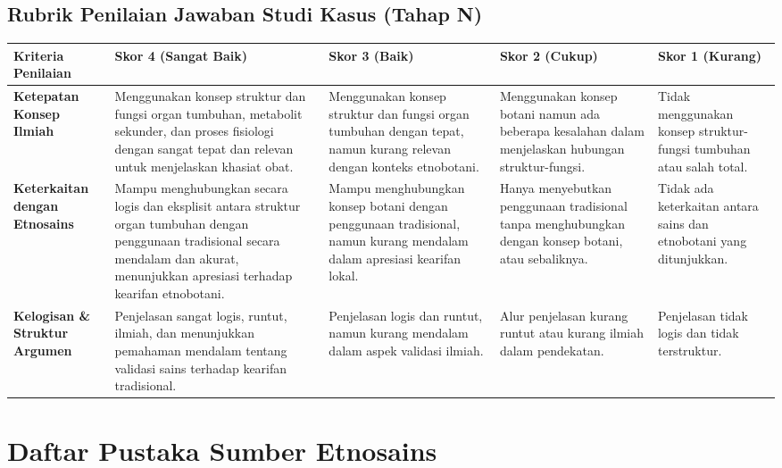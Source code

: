 \documentclass[a4paper,12pt]{article}
\begin{document}
\subsection{Rubrik Penilaian Jawaban Studi Kasus (Tahap N)}

\begin{longtable}{|p{3cm}|p{3cm}|p{3cm}|p{3cm}|p{3cm}|}
\hline
\textbf{Kriteria Penilaian} & \textbf{Skor 4 (Sangat Baik)} & \textbf{Skor 3 (Baik)} & \textbf{Skor 2 (Cukup)} & \textbf{Skor 1 (Kurang)} \\
\hline
\textbf{Ketepatan Konsep Ilmiah} & Menggunakan konsep struktur dan fungsi organ tumbuhan, metabolit sekunder, dan proses fisiologi dengan sangat tepat dan relevan untuk menjelaskan khasiat obat. & Menggunakan konsep struktur dan fungsi organ tumbuhan dengan tepat, namun kurang relevan dengan konteks etnobotani. & Menggunakan konsep botani namun ada beberapa kesalahan dalam menjelaskan hubungan struktur-fungsi. & Tidak menggunakan konsep struktur-fungsi tumbuhan atau salah total. \\
\hline
\textbf{Keterkaitan dengan Etnosains} & Mampu menghubungkan secara logis dan eksplisit antara struktur organ tumbuhan dengan penggunaan tradisional secara mendalam dan akurat, menunjukkan apresiasi terhadap kearifan etnobotani. & Mampu menghubungkan konsep botani dengan penggunaan tradisional, namun kurang mendalam dalam apresiasi kearifan lokal. & Hanya menyebutkan penggunaan tradisional tanpa menghubungkan dengan konsep botani, atau sebaliknya. & Tidak ada keterkaitan antara sains dan etnobotani yang ditunjukkan. \\
\hline
\textbf{Kelogisan \& Struktur Argumen} & Penjelasan sangat logis, runtut, ilmiah, dan menunjukkan pemahaman mendalam tentang validasi sains terhadap kearifan tradisional. & Penjelasan logis dan runtut, namun kurang mendalam dalam aspek validasi ilmiah. & Alur penjelasan kurang runtut atau kurang ilmiah dalam pendekatan. & Penjelasan tidak logis dan tidak terstruktur. \\
\hline
\end{longtable}

\section{Daftar Pustaka Sumber Etnosains}
\end{document}
